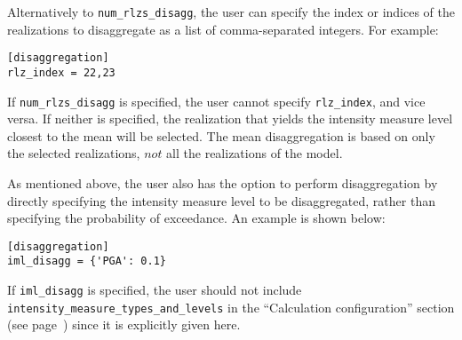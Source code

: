 Alternatively to \texttt{num\_rlzs\_disagg}, the user can specify the index or
indices of the realizations to disaggregate as a list of comma-separated
integers. For example:

\begin{verbatim}
[disaggregation]
rlz_index = 22,23
\end{verbatim}

If \texttt{num\_rlzs\_disagg} is specified, the user cannot specify
\texttt{rlz\_index}, and vice versa. If neither is specified, the
realization that yields the intensity measure level closest to the mean will be
selected. The mean disaggregation is based on only the selected realizations,
$not$ all the realizations of the model.  

As mentioned above, the user also has the option to perform disaggregation by
directly specifying the intensity measure level to be disaggregated, rather than
specifying the probability of exceedance. An example is shown below:

\begin{verbatim}
[disaggregation]
iml_disagg = {'PGA': 0.1}
\end{verbatim}

If \texttt{iml\_disagg} is specified, the user should not include
\texttt{intensity\_measure\_types\_and\_levels} in the ``Calculation
configuration'' section (see page~\pageref{sec:calculation_configuration}) since
it is explicitly given here.
